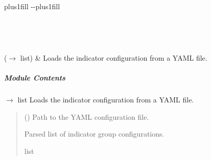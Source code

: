 \documentclass[letterpaper,10pt,english]{sphinxmanual}
\begin{document}
\begin{savenotes}
\sphinxatlongtablestart
\sphinxthistablewithglobalstyle
\sphinxthistablewithnovlinesstyle
\makeatletter
  \LTleft \@totalleftmargin plus1fill
  \LTright\dimexpr\columnwidth-\@totalleftmargin-\linewidth\relax plus1fill
\makeatother
\begin{longtable}{}
\sphinxtoprule
\endfirsthead

\\
\sphinxtoprule
\endhead

\sphinxbottomrule
{}\\
\endfoot

\endlastfoot
\sphinxtableatstartofbodyhook

\sphinxAtStartPar
{\hyperref[\detokenize{autoapi/modules/input/indicator_config/index:modules.input.indicator_config.load_indicator_config}]{}}(\(\rightarrow\) list)
&
\sphinxAtStartPar
Loads the indicator configuration from a YAML file.
\\
\sphinxbottomrule
\end{longtable}
\sphinxtableafterendhook
\sphinxatlongtableend
\end{savenotes}


\subparagraph{Module Contents}
\label{\detokenize{autoapi/modules/input/indicator_config/index:module-contents}}

\begin{fulllineitems}
\label{\detokenize{autoapi/modules/input/indicator_config/index:modules.input.indicator_config.load_indicator_config}}
\pysigstartsignatures
\pysiglinewithargsret
{}
{}
{{ $\rightarrow$ list}}
\pysigstopsignatures
\sphinxAtStartPar
Loads the indicator configuration from a YAML file.
\begin{quote}\begin{description}
\sphinxAtStartPar
{} () \textendash{} Path to the YAML configuration file.

\sphinxAtStartPar
Parsed list of indicator group configurations.

\sphinxAtStartPar
list

\end{description}\end{quote}

\end{fulllineitems}
\end{document}
